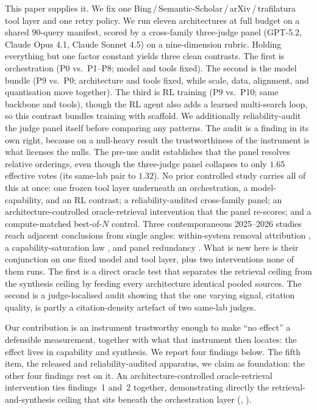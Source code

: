 \documentclass[11pt]{article}
\begin{document}
This paper supplies it. We fix one Bing\,/\,Semantic-Scholar\,/\,arXiv\,/\,trafilatura
tool layer and one retry policy. We run eleven architectures at full budget on a
shared $90$-query manifest, scored by a cross-family three-judge panel (GPT-5.2,
Claude Opus 4.1, Claude Sonnet 4.5) on a nine-dimension rubric. Holding everything
but one factor constant yields three clean contrasts. The first is orchestration
(P0 vs.\ P1--P8; model
and tools fixed). The second is the model bundle (P9 vs.\ P0; architecture and
tools fixed, while scale, data, alignment, and quantisation move together). The
third is RL
training (P9 vs.\ P10; same backbone and tools), though the RL agent also adds a
learned multi-search loop, so this contrast bundles training with scaffold. We
additionally reliability-audit the
judge panel itself before comparing any patterns. The audit
is a finding in its own right, because on a null-heavy result the
trustworthiness of the instrument is what licenses the nulls. The pre-use audit establishes that the panel resolves
relative orderings, even though the
three-judge panel collapses to only $1.65$ effective votes (its same-lab pair to
$1.32$). No prior controlled study carries
all of this at once: one frozen tool layer underneath an orchestration, a model-capability, and an RL contrast; a
reliability-audited cross-family panel; an architecture-controlled oracle-retrieval intervention
that the panel re-scores; and a compute-matched best-of-$N$ control. Three contemporaneous
2025--2026 studies reach
adjacent conclusions from single angles: within-system removal attribution
\citep{lu2026agentsthatmatter}, a capability-saturation law \citep{scaling_agents2025}, and panel
redundancy \citep{kohli2026ninejudges}. What is new here is
their conjunction on one fixed model and tool layer, plus two interventions none
of them runs. The first is a
direct oracle test that separates the retrieval ceiling from the synthesis ceiling by feeding every
architecture identical pooled sources. The second is a judge-localised audit showing that the one
varying signal, citation quality, is partly a citation-density artefact of two same-lab judges.

Our contribution is an instrument trustworthy enough to make
``no effect'' a defensible measurement, together with what that instrument then locates: the
effect lives in capability and synthesis. We
report four findings below. The fifth item, the released and reliability-audited apparatus, we
claim as foundation: the other four findings rest on it. An architecture-controlled
oracle-retrieval intervention ties
findings~1 and~2 together, demonstrating directly the retrieval-and-synthesis ceiling that sits beneath the
orchestration layer (, ).
\end{document}
